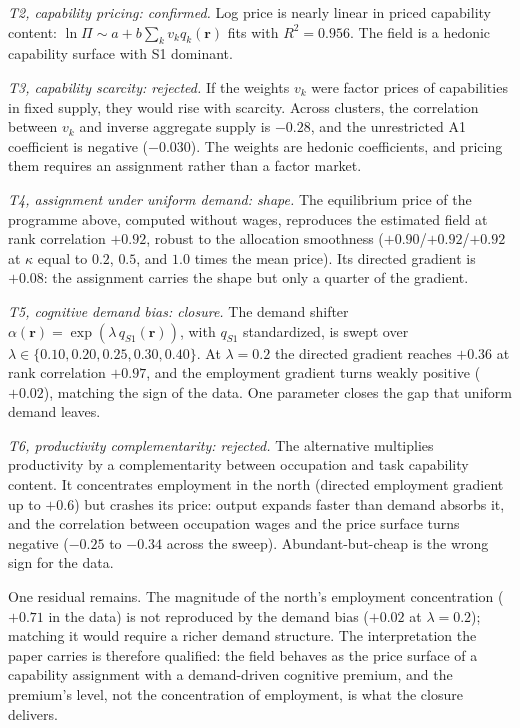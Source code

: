 \documentclass[12pt, a4paper]{article}
\begin{document}
\emph{T2, capability pricing: confirmed.} Log price is nearly linear
in priced capability content:
$\ln\Pi \sim a + b \sum_k v_k q_k(\mathbf{r})$ fits with
$R^2 = 0.956$. The field is a hedonic capability surface with S1
dominant.

\emph{T3, capability scarcity: rejected.} If the weights $v_k$ were
factor prices of capabilities in fixed supply, they would rise with
scarcity. Across clusters, the correlation between $v_k$ and inverse
aggregate supply is $-0.28$, and the unrestricted A1 coefficient is
negative ($-0.030$). The weights are hedonic coefficients, and pricing
them requires an assignment rather than a factor market.

\emph{T4, assignment under uniform demand: shape.} The equilibrium
price of the programme above, computed without wages, reproduces the
estimated field at rank correlation $+0.92$, robust to the allocation
smoothness ($+0.90$/$+0.92$/$+0.92$ at $\kappa$ equal to $0.2$, $0.5$,
and $1.0$ times the mean price). Its directed gradient is $+0.08$:
the assignment carries the shape but only a quarter of the gradient.

\emph{T5, cognitive demand bias: closure.} The demand shifter
$\alpha(\mathbf{r}) = \exp(\lambda\, q_{S1}(\mathbf{r}))$, with $q_{S1}$
standardized, is swept over
$\lambda \in \{0.10, 0.20, 0.25, 0.30, 0.40\}$. At $\lambda = 0.2$ the
directed gradient reaches $+0.36$ at rank correlation $+0.97$, and the
employment gradient turns weakly positive ($+0.02$), matching the sign
of the data. One parameter closes the gap that uniform demand leaves.

\emph{T6, productivity complementarity: rejected.} The alternative
multiplies productivity by a complementarity between occupation and
task capability content. It concentrates employment in the north
(directed employment gradient up to $+0.6$) but crashes its price:
output expands faster than demand absorbs it, and the correlation
between occupation wages and the price surface turns negative
($-0.25$ to $-0.34$ across the sweep). Abundant-but-cheap is the
wrong sign for the data.

One residual remains. The magnitude of the north's
employment concentration ($+0.71$ in the data) is not reproduced by
the demand bias ($+0.02$ at $\lambda = 0.2$); matching it would
require a richer demand structure. The interpretation the paper
carries is therefore qualified: the field behaves as the price surface
of a capability assignment with a demand-driven cognitive premium, and
the premium's level, not the concentration of employment, is what the
closure delivers.
\end{document}
